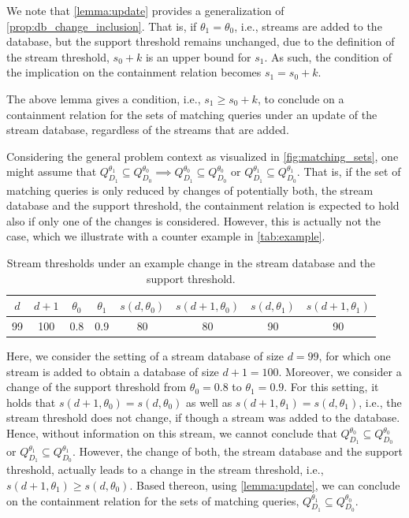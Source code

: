 We note that \autoref{lemma:update} provides a
generalization of \autoref{prop:db_change_inclusion}.
That is, if $\theta_1 = \theta_0$, i.e., streams are
added to the database, but the support threshold
remains unchanged, due to the definition of the stream threshold, $s_0+k$ is an
upper bound for $s_1$. As such, the condition of the implication on the
containment relation becomes $s_1 = s_0+k$.

The above lemma gives a condition, i.e., $s_1\geq
s_0+k$, to conclude on a containment relation for the
sets of matching queries under an update of the stream
database, regardless of the streams that are added.

Considering the general problem context as visualized
in \autoref{fig:matching_sets}, one might assume that
$Q_{D_1}^{\theta_1}\subseteq Q_{D_0}^{\theta_0}
\implies Q_{D_1}^{\theta_0}\subseteq
Q_{D_0}^{\theta_0}$ or $Q_{D_1}^{\theta_1}\subseteq
Q_{D_0}^{\theta_1}$. That is, if the set of matching
queries is only reduced by changes of potentially
both, the stream database and the support threshold,
the containment relation is expected to hold also if
only one of the changes is considered.
However, this is actually not the case, which we
illustrate with a counter example in
\autoref{tab:example}.

\begin{table}[h!]
  \centering
  \begin{tabular}{@{}cccccccc@{}}
  \toprule
  $d$ & $d+1$ & $\theta_0$ & $\theta_1$ &
  $s(d,\theta_0)$ & $s(d+1,\theta_0)$ &
  $s(d,\theta_1)$ & $s(d+1,\theta_1)$ \\ \midrule
  99  & 100   & 0.8        & 0.9        & 80              & 80                & 90              & 90                \\ \bottomrule
  \end{tabular}%
  \caption{Stream thresholds under an example change
  in the stream database and the support threshold.}
  \label{tab:example}
  \end{table}

Here, we consider the setting of a stream database of
size $d=99$, for which one stream is added to obtain a
database of size $d+1=100$. Moreover, we consider a
change of the support threshold from $\theta_0=0.8$ to
$\theta_1=0.9$. For this setting, it holds that
$s(d+1,\theta_0) = s(d,\theta_0)$ as well as
$s(d+1,\theta_1) = s(d,\theta_1)$, i.e., the stream threshold does not change, if
though a stream was added to the database. Hence, without information on this
stream, we cannot
conclude that $Q_{D_1}^{\theta_0} \subseteq
Q_{D_0}^{\theta_0}$ or
$Q_{D_1}^{\theta_1} \subseteq Q_{D_0}^{\theta_1}$.
However, the change of both, the stream database and the support threshold,
actually leads to a change in the stream threshold, i.e., $s(d+1,\theta_1) \geq
s(d,\theta_0)$. Based thereon, using \autoref{lemma:update}, we can conclude on
the containment relation for the sets of matching queries, $Q_{D_1}^{\theta_1}
\subseteq Q_{D_0}^{\theta_0}$.

